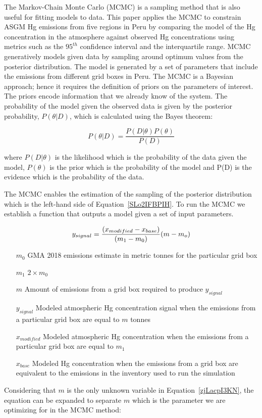 The Markov-Chain Monte Carlo (MCMC) is a sampling method that is also useful for fitting models to data. This paper applies the MCMC to constrain ASGM Hg emissions from five regions in Peru by comparing the model of the Hg concentration in the atmosphere against observed Hg concentrations using metrics such as the $95^{th}$ confidence interval and the interquartile range. MCMC generatively models given data by sampling around optimum values from the posterior distribution. The model is generated by a set of parameters that include the emissions from different grid boxes in Peru. The MCMC is a Bayesian approach; hence it requires the definition of priors on the parameters of interest. The priors encode information that we already know of the system. The probability of the model given the observed data is given by the posterior probability, $P(\theta|D)$, which is calculated using the Bayes theorem:



\begin{equation}
\label{SLo2IFBPIH}
P(\theta|D)=\frac{P(D|\theta)P(\theta)}{P(D)}
\end{equation}



where $P(D|\theta)$ is the likelihood which is the probability of the data given the model, $P(\theta)$ is the prior which is the probability of the model and P(D) is the evidence which is the probability of the data.

The MCMC enables the estimation of the sampling of the posterior distribution which is the left-hand side of Equation~\ref{SLo2IFBPIH}. To run the MCMC we establish a function that outputs a model given a set of input parameters.



\begin{equation}
\label{zjLacpI3KN}
\small{y_{signal}} =\small\frac{(x_{modified} -x_{base})}{(m_1 -m_0)}\small{(m -m_o)}
\end{equation}

\begin{itemize}[labelwidth={3.5em},font=\bfseries,align=left]
  \item [$m_0$] GMA 2018 emissions estimate in metric tonnes for the particular grid box
  \item [$m_1$] $2\times m_0$
  \item [$m$] Amount of emissions from a grid box required to produce $y_{signal}$
  \item [$y_{signal}$] Modeled atmospheric Hg concentration signal when the emissions from a particular grid box are equal to $m$ tonnes
  \item [$x_{modified}$] Modeled atmospheric Hg concentration when the emissions from a particular grid box are equal to $m_1$
  \item [$x_{base}$] Modeled Hg concentration when the emissions from a grid box are equivalent to the emissions in the inventory used to run the simulation
\end{itemize}
Considering that $m$ is the only unknown variable in Equation~\ref{zjLacpI3KN}, the equation can be expanded to separate $m$ which is the parameter we are optimizing for in the MCMC method:

